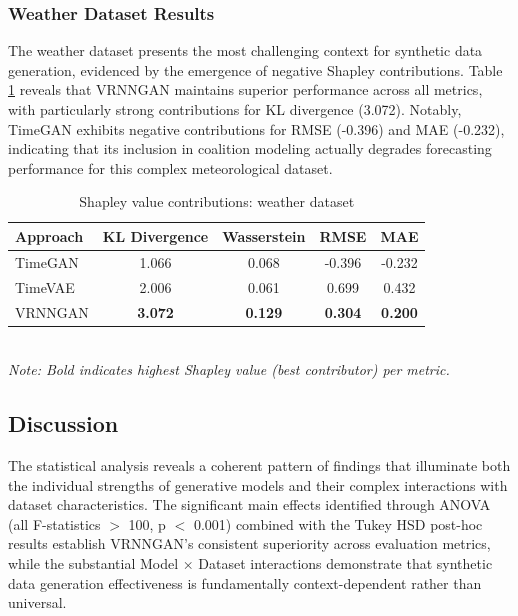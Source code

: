 \documentclass{article}
\begin{document}
\subsubsection{Weather Dataset Results}
The weather dataset presents the most challenging context for synthetic data generation, evidenced by the emergence of negative Shapley contributions. Table \ref{tab:shapley_weather} reveals that VRNNGAN maintains superior performance across all metrics, with particularly strong contributions for KL divergence (3.072). Notably, TimeGAN exhibits negative contributions for RMSE (-0.396) and MAE (-0.232), indicating that its inclusion in coalition modeling actually degrades forecasting performance for this complex meteorological dataset.

\begin{table}[H]
\centering
\caption{Shapley value contributions: weather dataset}
\label{tab:shapley_weather}
\begin{tabular}{lcccc}
\toprule
\textbf{Approach} & \textbf{KL Divergence} & \textbf{Wasserstein} & \textbf{RMSE} & \textbf{MAE} \\
\midrule
TimeGAN & 1.066 & 0.068 & -0.396 & -0.232 \\
TimeVAE & 2.006 & 0.061 & 0.699 & 0.432 \\
VRNNGAN & \textbf{3.072} & \textbf{0.129} & \textbf{0.304} & \textbf{0.200} \\
\bottomrule
\end{tabular}
\\[0.5em]
\footnotesize
\textit{Note: Bold indicates highest Shapley value (best contributor) per metric.}
\end{table}

\subsection{Discussion}

The statistical analysis reveals a coherent pattern of findings that illuminate both the individual strengths of generative models and their complex interactions with dataset characteristics. The significant main effects identified through ANOVA (all F-statistics $>$ 100, p $<$ 0.001) combined with the Tukey HSD post-hoc results establish VRNNGAN's consistent superiority across evaluation metrics, while the substantial Model × Dataset interactions demonstrate that synthetic data generation effectiveness is fundamentally context-dependent rather than universal.
\end{document}
